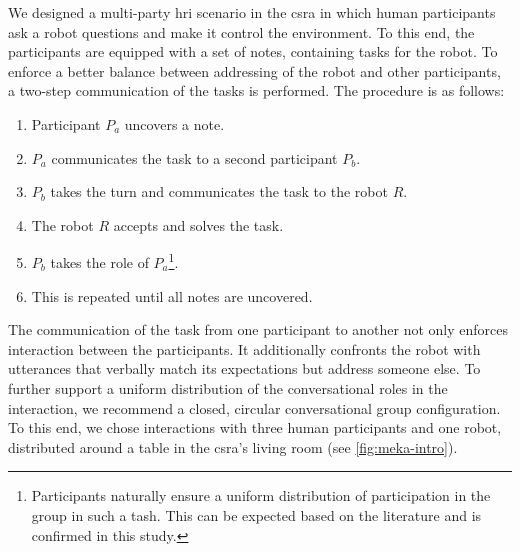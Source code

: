 We designed a multi-party \gls{hri} scenario in the \gls{csra} in which human participants ask a \gls{robot} questions and make it control the environment.
To this end, the participants are equipped with a set of notes, containing tasks for the \gls{robot}.
To enforce a better balance between addressing of the \gls{robot} and other participants, a two-step communication of the tasks is performed.
The procedure is as follows:
\begin{enumerate}
    \item Participant \(P_a\) uncovers a note.
    \item \(P_a\) communicates the task to a second participant \(P_b\).
    \item \(P_b\) takes the \gls{turn} and communicates the task to the \gls{robot} \(R\).
    \item The \gls{robot} \(R\) accepts and solves the task. 
    \item \(P_b\) takes the role of \(P_a\)\footnote{Participants naturally ensure a uniform distribution of participation in the group in such a tash. This can be expected based on the literature and is confirmed in this study.}.
    \item This is repeated until all notes are uncovered. 
\end{enumerate}
The communication of the task from one participant to another not only enforces interaction between the participants.
It additionally confronts the \gls{robot} with utterances that verbally match its expectations but address someone else.
To further support a uniform distribution of the \glspl{conversational role} in the interaction, we recommend a closed, circular \gls{conversational group} configuration.
To this end, we chose interactions with three human participants and one \gls{robot}, distributed around a table in the \gls{csra}'s living room (see \cref{fig:meka-intro}).
